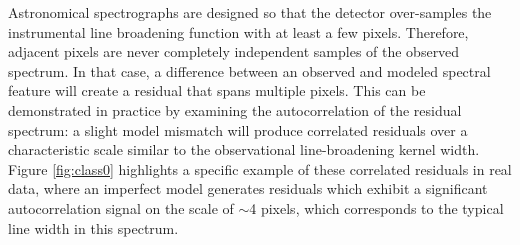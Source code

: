 \documentclass[iop,floatfix]{emulateapj}
\begin{document}
Astronomical spectrographs are designed so that the detector over-samples the instrumental line 
broadening function with at least a few pixels.  Therefore, adjacent pixels are never completely 
independent samples of the observed spectrum.  In that case, a difference between an observed and 
modeled spectral feature will create a residual that spans multiple pixels.  This can be 
demonstrated in practice by examining the autocorrelation of the residual spectrum: a slight model 
mismatch will produce correlated residuals over a characteristic scale similar to the observational 
line-broadening kernel width.  Figure \ref{fig:class0} highlights a specific example of these 
correlated residuals in real data, where an imperfect model generates residuals which exhibit a 
significant autocorrelation signal on the scale of $\sim$4 pixels, which corresponds to the typical 
line width in this spectrum.  
\end{document}
